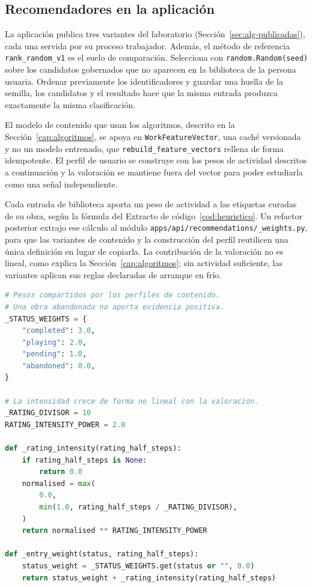 \subsection{Recomendadores en la aplicación}\label{sec:impl-heuristico}

La aplicación publica tres variantes del laboratorio (Sección~\ref{sec:alg-publicadas}), cada una
servida por su proceso trabajador. Además, el método de referencia \texttt{rank\_random\_v1} es el suelo de
comparación. Selecciona con
\texttt{random.Random(seed)} sobre los candidatos gobernados que no aparecen en la biblioteca
de la persona usuaria. Ordenar previamente los identificadores y guardar una huella de la
semilla, los candidatos y el resultado hace que la misma entrada produzca exactamente la
misma clasificación.

El modelo de contenido que usan los algoritmos, descrito en la
Sección~\ref{cap:algoritmos}, se apoya en \texttt{WorkFeatureVector}, una caché versionada y
no un modelo entrenado, que \texttt{rebuild\_feature\_vectors} rellena de forma idempotente. El
perfil de usuario se construye con los pesos de actividad descritos a continuación y la
valoración se mantiene fuera del vector para poder estudiarla como una señal independiente.

\begin{samepage}
Cada entrada de biblioteca aporta un peso de actividad a las etiquetas curadas de su obra,
según la fórmula del Extracto de código~\ref{cod:heuristico}. Un refactor posterior extrajo ese
cálculo al módulo \texttt{apps/api/recommendations/\_weights.py}, para que las variantes de
contenido y la construcción del perfil reutilicen una única definición en lugar de copiarla. La
contribución de la valoración no es lineal, como explica la Sección~\ref{cap:algoritmos}; sin
actividad suficiente, las variantes aplican sus reglas declaradas de arranque en frío.

\begin{lstlisting}[language=Python, basicstyle=\small\ttfamily, caption={Cálculo del peso de actividad de una entrada de biblioteca.}, label={cod:heuristico}, captionpos=b]
# Pesos compartidos por los perfiles de contenido.
# Una obra abandonada no aporta evidencia positiva.
_STATUS_WEIGHTS = {
    "completed": 3.0,
    "playing": 2.0,
    "pending": 1.0,
    "abandoned": 0.0,
}

# La intensidad crece de forma no lineal con la valoracion.
_RATING_DIVISOR = 10
RATING_INTENSITY_POWER = 2.0

def _rating_intensity(rating_half_steps):
    if rating_half_steps is None:
        return 0.0
    normalised = max(
        0.0,
        min(1.0, rating_half_steps / _RATING_DIVISOR),
    )
    return normalised ** RATING_INTENSITY_POWER

def _entry_weight(status, rating_half_steps):
    status_weight = _STATUS_WEIGHTS.get(status or "", 0.0)
    return status_weight + _rating_intensity(rating_half_steps)
\end{lstlisting}
\end{samepage}

